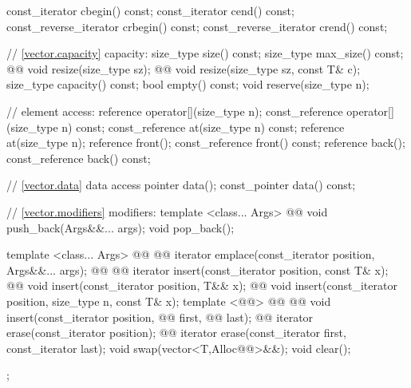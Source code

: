\documentclass[american,twoside]{book}
\begin{document}
\begin{codeblock}
{{    const_iterator         cbegin() const;
    const_iterator         cend() const;
    const_reverse_iterator crbegin() const;
    const_reverse_iterator crend() const;

    // \ref{vector.capacity} capacity:
    size_type size() const;
    size_type max_size() const;
    @@
      void resize(size_type sz);
    @@
      void resize(size_type sz, const T& c);
    size_type capacity() const;
    bool      empty() const;
    void reserve(size_type n);

    // element access:
    reference       operator[](size_type n);
    const_reference operator[](size_type n) const;
    const_reference at(size_type n) const;
    reference       at(size_type n);
    reference       front();
    const_reference front() const;
    reference       back();
    const_reference back() const;

    // \ref{vector.data} data access
    pointer         data();
    const_pointer   data() const;

    // \ref{vector.modifiers} modifiers:
    template <class... Args> 
      @@
      void push_back(Args&&... args);
    void pop_back();

    template <class... Args> 
      @@
            @@
      iterator emplace(const_iterator position, Args&&... args);
    @@ @@
      iterator insert(const_iterator position, const T& x);
    @@
      void insert(const_iterator position, T&& x);
    @@
      void insert(const_iterator position, size_type n, const T& x);
    template <@@>
        @@
              @@
        void insert(const_iterator position,
                    @@ first, @@ last);
    @@ iterator erase(const_iterator position);
    @@ iterator erase(const_iterator first, const_iterator last);
    void     swap(vector<T,Alloc@@>&&);
    void     clear();
  };

}
\end{codeblock}
\end{document}
